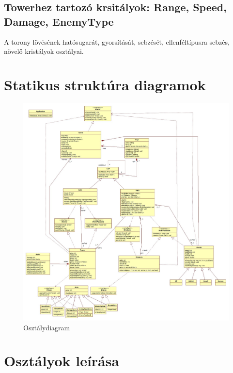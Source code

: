 \subsection{Towerhez tartozó krsitályok: Range, Speed, Damage, EnemyType}
A torony lövésének hatósugarát, gyorsítását, sebzését, ellenféltípusra sebzés, növelő kristályok osztályai.






\section{Statikus struktúra diagramok}

\begin{figure}[H]
\begin{center}
\includegraphics[width=17cm]{chapters/chapter04/images/Main.jpg}
\caption{Osztálydiagram}
\label{fig:Osztálydiagram}
\end{center}
\end{figure}


\section{Osztályok leírása}

